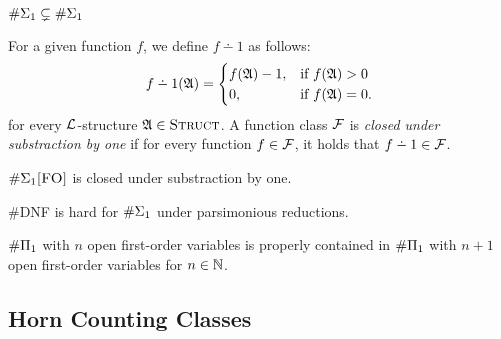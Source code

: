 \begin{theorem} \label{sigma1strict}
	$\#\Sigma_1 \subsetneq \#\Sigma_{1}$
\end{theorem}

For a given function $f$, we define $f \dotminus 1$ as follows:
\begin{eqnarray*}
	f \dotminus 1(\A) =
	\begin{cases}
		f(\A)-1, & \text{if }f(\A) > 0 \\
		0, & \text{if }f(\A) = 0.
	\end{cases}
\end{eqnarray*}
for every $\L$-structure $\mathfrak{A} \in \text{\sc Struct}$. A function class $\F$ is {\em closed under substraction by one} if for every function $f \in \F$, it holds that $f \dotminus 1 \in \F$.

\begin{theorem} \label{sigmafo-minusone}
	$\#\Sigma_{1}\textsc{[FO]}$ is closed under substraction by one.
\end{theorem}

\begin{theorem} \label{dnf-pars}
	{\sc \#DNF} is hard for $\#\Sigma_{1}$ under parsimonious reductions. 
\end{theorem}

\begin{theorem} \label{nplusone-strict}
	$\#\Pi_{1}$ with $n$ open first-order variables is properly contained in $\#\Pi_{1}$ with $n+1$ open first-order variables for $n\in\mathbb{N}$.  
\end{theorem}

\subsection{Horn Counting Classes}

